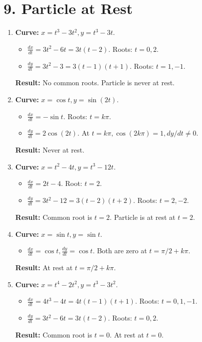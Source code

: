 \documentclass[12pt]{article}
\newcommand{\problemsettitle}[1]{\section*{#1}}
\begin{document}
\newpage
\problemsettitle{9. Particle at Rest}
\begin{enumerate}
    \item \textbf{Curve:} $x=t^3-3t^2, y=t^3-3t$.
    \begin{itemize}
        \item $\frac{dx}{dt} = 3t^2-6t=3t(t-2)$. Roots: $t=0, 2$.
        \item $\frac{dy}{dt} = 3t^2-3=3(t-1)(t+1)$. Roots: $t=1, -1$.
    \end{itemize}
    \textbf{Result:} No common roots. Particle is never at rest.

    \item \textbf{Curve:} $x=\cos t, y=\sin(2t)$.
    \begin{itemize}
        \item $\frac{dx}{dt}=-\sin t$. Roots: $t=k\pi$.
        \item $\frac{dy}{dt}=2\cos(2t)$. At $t=k\pi, \cos(2k\pi)=1, dy/dt \ne 0$.
    \end{itemize}
    \textbf{Result:} Never at rest.

    \item \textbf{Curve:} $x=t^2-4t, y=t^3-12t$.
    \begin{itemize}
        \item $\frac{dx}{dt}=2t-4$. Root: $t=2$.
        \item $\frac{dy}{dt}=3t^2-12=3(t-2)(t+2)$. Roots: $t=2, -2$.
    \end{itemize}
    \textbf{Result:} Common root is $t=2$. Particle is at rest at $t=2$.

    \item \textbf{Curve:} $x=\sin t, y=\sin t$.
    \begin{itemize}
        \item $\frac{dx}{dt}=\cos t, \frac{dy}{dt}=\cos t$. Both are zero at $t=\pi/2+k\pi$.
    \end{itemize}
    \textbf{Result:} At rest at $t=\pi/2+k\pi$.

    \item \textbf{Curve:} $x=t^4-2t^2, y=t^3-3t^2$.
    \begin{itemize}
        \item $\frac{dx}{dt}=4t^3-4t=4t(t-1)(t+1)$. Roots: $t=0,1,-1$.
        \item $\frac{dy}{dt}=3t^2-6t=3t(t-2)$. Roots: $t=0,2$.
    \end{itemize}
    \textbf{Result:} Common root is $t=0$. At rest at $t=0$.


\end{enumerate}
\end{document}
